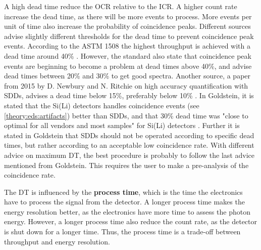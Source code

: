 A high dead time reduce the OCR relative to the ICR.
A higher count rate increase the dead time, as there will be more events to process.
More events per unit of time also increase the probability of coincidence peaks.
Different sources advise slightly different thresholds for the dead time to prevent coincidence peak events.
According to the ASTM 1508 the highest throughput is achieved with a dead time around 40\% \cite{astm_e1508_eds_quantification}.
However, the standard also state that coincidence peak events are beginning to become a problem at dead times above 40\%, and advise dead times between 20\% and 30\% to get good spectra.
Another source, a paper from 2015 by D. Newbury and N. Ritchie on high accuracy quantification with SDDs, advises a dead time below 15\%, preferably below 10\% \cite{newbury_deadtime_2014}.
In Goldstein, it is stated that the Si(Li) detectors handles coincidence events (see \cref{theory:eds:artifacts}) better than SDDs, and that 30\% dead time was "close to optimal for all vendors and most samples" for Si(Li) detectors \cite[p. 466]{goldstein_scanning_2018}.
Further it is stated in Goldstein that SDDs should not be operated according to specific dead times, but rather according to an acceptable low coincidence rate.
With different advice on maximum DT, the best procedure is probably to follow the last advice mentioned from Goldstein.
This requires the user to make a pre-analysis of the coincidence rate.


The DT is influenced by the \textbf{process time}, which is the time the electronics have to process the signal from the detector.
A longer process time makes the energy resolution better, as the electronics have more time to assess the photon energy.
However, a longer process time also reduce the count rate, as the detector is shut down for a longer time.
Thus, the process time is a trade-off between throughput and energy resolution.


